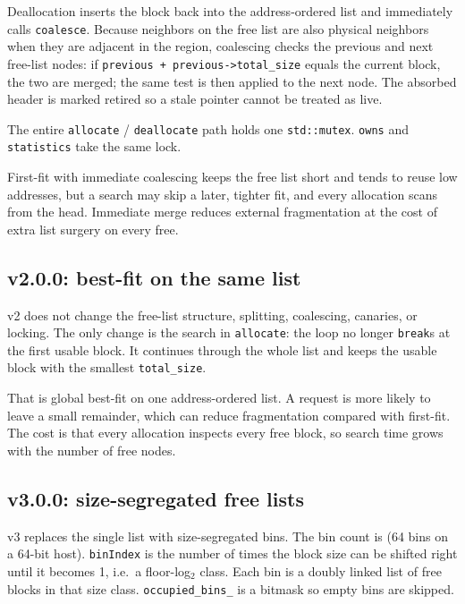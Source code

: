 Deallocation inserts the block back into the address-ordered list and
immediately calls \texttt{coalesce}.
Because neighbors on the free list are also physical neighbors when they are
adjacent in the region, coalescing checks the previous and next free-list
nodes:
if \texttt{previous + previous->total\_size} equals the current block, the two
are merged; the same test is then applied to the next node.
The absorbed header is marked retired so a stale pointer cannot be treated as
live.

The entire \texttt{allocate} / \texttt{deallocate} path holds one
\texttt{std::mutex}.
\texttt{owns} and \texttt{statistics} take the same lock.

First-fit with immediate coalescing keeps the free list short and tends to
reuse low addresses, but a search may skip a later, tighter fit, and every
allocation scans from the head.
Immediate merge reduces external fragmentation at the cost of extra list
surgery on every free.

\subsection{v2.0.0: best-fit on the same list}

v2 does not change the free-list structure, splitting, coalescing, canaries, or
locking.
The only change is the search in \texttt{allocate}: the loop no longer
\texttt{break}s at the first usable block.
It continues through the whole list and keeps the usable block with the
smallest \texttt{total\_size}.

That is global best-fit on one address-ordered list.
A request is more likely to leave a small remainder, which can reduce
fragmentation compared with first-fit.
The cost is that every allocation inspects every free block, so search time
grows with the number of free nodes.

\subsection{v3.0.0: size-segregated free lists}

v3 replaces the single list with size-segregated bins.
The bin count is 
(64 bins on a 64-bit host).
\texttt{binIndex} is the number of times the block size can be shifted right
until it becomes 1, i.e.\ a floor-log$_2$ class.
Each bin is a doubly linked list of free blocks in that size class.
\texttt{occupied\_bins\_} is a bitmask so empty bins are skipped.

